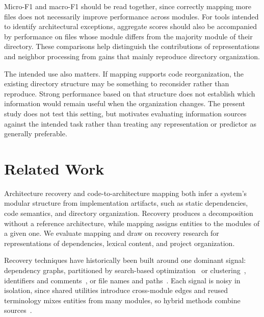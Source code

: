 Micro-F1 and macro-F1 should be read together, since correctly mapping more files does not necessarily improve performance across modules. For tools intended to identify architectural exceptions, aggregate scores should also be accompanied by performance on files whose module differs from the majority module of their directory. These comparisons help distinguish the contributions of representations and neighbor processing from gains that mainly reproduce directory organization.

The intended use also matters. If mapping supports code reorganization, the existing directory structure may be something to reconsider rather than reproduce. Strong performance based on that structure does not establish which information would remain useful when the organization changes. The present study does not test this setting, but motivates evaluating information sources against the intended task rather than treating any representation or predictor as generally preferable.
\section{Related Work\label{sec:work}}

Architecture recovery and code-to-architecture mapping both infer a system's modular structure from implementation artifacts, such as static dependencies, code semantics, and directory organization. Recovery produces a decomposition without a reference architecture, while mapping assigns entities to the modules of a given one. We evaluate mapping and draw on recovery research for representations of dependencies, lexical content, and project organization.

Recovery techniques have historically been built around one dominant signal: dependency graphs, partitioned by search-based optimization~\cite{bunch,bunch_sahc_nahc,dagc,wca,mca_eca} or clustering~\cite{cct,hcc_2019,limbo,fca,neighborhood_tree_2019,gma_2021}, identifiers and comments~\cite{arc,zbr,risi2012fold,kargar2017semantic}, or file names and paths~\cite{file_clustering}. Each signal is noisy in isolation, since shared utilities introduce cross-module edges and reused terminology mixes entities from many modules, so hybrid methods combine sources~\cite{sc_misra,escrc,nsga3,sadat2019multi,ensemble_recovery,evol,sade,sarif}.

